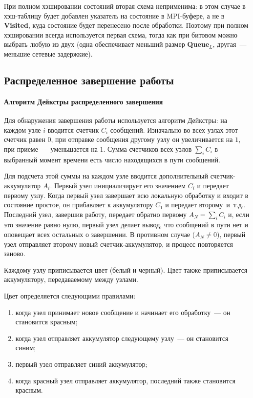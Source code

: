\documentclass[12pt,a4paper,fleqn]{article}
\newcommand{\Code}[1]{\textbf{\mbox{#1}}}
\newcommand\etc{~и~т.д.}
\begin{document}
При полном хэшировании состояний вторая схема неприменима: в этом случае в хэш-таблицу будет
добавлен указатель на состояние в MPI-буфере, а не в \Code{Visited}, куда состояние будет перенесено
после обработки. Поэтому при полном хэшировании всегда используется первая схема, тогда как при
битовом можно выбрать любую из двух (одна обеспечивает меньший размер \Code{Queue$_L$}, другая~---
меньшие сетевые задержкие).

\subsection{Распределенное завершение работы}

\paragraph{Алгоритм Дейкстры распределенного завершения}

Для обнаружения завершения работы используется алгоритм Дейкстры: на каждом узле $i$
вводится счетчик $C_i$ сообщений. Изначально во всех узлах этот счетчик равен $0$, при
отправке сообщения другому узлу он увеличивается на $1$, при приеме~--- уменьшается на
$1$. Сумма счетчиков всех узлов $\sum_iC_i$ в выбранный момент времени есть число
находящихся в пути сообщений. 

Для подсчета этой суммы на каждом узле вводится дополнительный счетчик-аккумулятор
$A_i$. Первый узел инициализирует его значением $C_i$ и передает первому узлу. Когда
первый узел завершает всю локальную обработку и входит в состояние простое, он прибавляет
к аккумулятору $C_1$ и передает второму\etc. Последний узел, завершив работу, передает
обратно первому $A_N = \sum_iC_i$ и, если это значение равно нулю, первый узел делает
вывод, что сообщений в пути нет и оповещает всех остальных о завершении. В противном
случае ($A_N \neq 0$), первый узел отправляет второму новый счетчик-аккумулятор, и процесс
повторяется заново.

Каждому узлу приписывается цвет (белый и черный). Цвет также приписывается аккумулятору,
передаваемому между узлами.

Цвет определяется следующими правилами:
\begin{enumerate}
\item когда узел принимает новое сообщение и начинает его обработку~--- он становится красным;
\item когда узел отправляет аккумулятор следующему узлу~--- он становится синим;
\item первый узел отправляет синий аккумулятор;
\item когда красный узел отправляет аккумулятор, последний также становится красным.
\end{enumerate}
\end{document}
